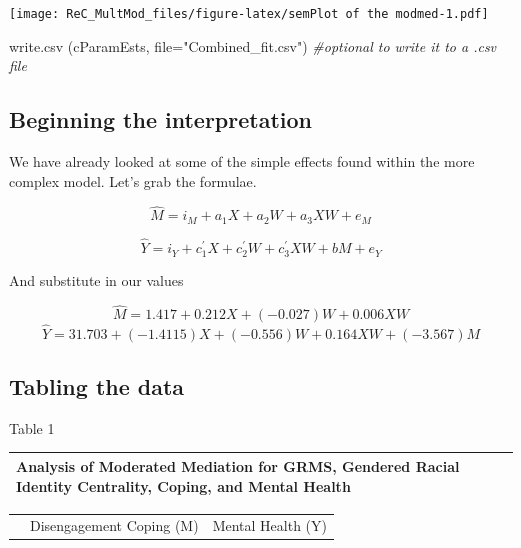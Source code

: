 \documentclass[
  english,
]{book}
\newenvironment{Shaded}{\begin{snugshade}}{\end{snugshade}}
\newcommand{\AttributeTok}[1]{\textcolor[rgb]{0.77,0.63,0.00}{#1}}
\newcommand{\CommentTok}[1]{\textcolor[rgb]{0.56,0.35,0.01}{\textit{#1}}}
\newcommand{\FunctionTok}[1]{\textcolor[rgb]{0.00,0.00,0.00}{#1}}
\newcommand{\NormalTok}[1]{#1}
\newcommand{\StringTok}[1]{\textcolor[rgb]{0.31,0.60,0.02}{#1}}
\begin{document}
\texttt{[image: ReC\_MultMod\_files/figure-latex/semPlot of the modmed-1.pdf]}

\begin{Shaded}
\begin{Highlighting}[]
\FunctionTok{write.csv}\NormalTok{ (cParamEsts, }\AttributeTok{file=}\StringTok{"Combined\_fit.csv"}\NormalTok{) }\CommentTok{\#optional to write it to a .csv file}
\end{Highlighting}
\end{Shaded}

\hypertarget{beginning-the-interpretation}{%
\subsection{Beginning the interpretation}\label{beginning-the-interpretation}}

We have already looked at some of the simple effects found within the more complex model. Let's grab the formulae.

\[\hat{M} = i_{M}+a_{1}X + a_{2}W + a_{3}XW + e_{M}\]

\[\hat{Y} = i_{Y}+c_{1}^{'}X+ c_{2}^{'}W+c_{3}^{'}XW+ bM+e_{Y}\]

And substitute in our values

\[\hat{M} = 1.417 + 0.212X + (-0.027) W + 0.006XW\]
\[\hat{Y} = 31.703 + (-1.4115)X + (-0.556)W + 0.164XW + (-3.567)M\]

\hypertarget{tabling-the-data}{%
\subsection{Tabling the data}\label{tabling-the-data}}

Table 1

\begin{longtable}[]{@{}
  >{\raggedright\arraybackslash}p{}@{}}
\toprule
Analysis of Moderated Mediation for GRMS, Gendered Racial Identity Centrality, Coping, and Mental Health \\
\midrule
\endhead
\bottomrule
\end{longtable}

\begin{longtable}[]{@{}lcc@{}}
\toprule
& & \\
\midrule
\endhead
& Disengagement Coping (M) & Mental Health (Y) \\
\bottomrule
\end{longtable}
\end{document}
